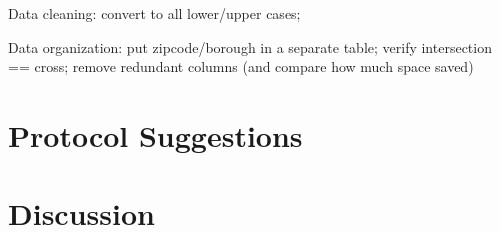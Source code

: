 \documentclass[12pt, titlepage]{article}
\begin{document}
Data cleaning: convert to all lower/upper cases;

Data organization: put zipcode/borough in a separate table; verify intersection
== cross; remove redundant columns (and compare how much space saved)



\section{Protocol Suggestions} \label{sec:protocol}



\section{Discussion} \label{sec:discussion}




\end{document}
